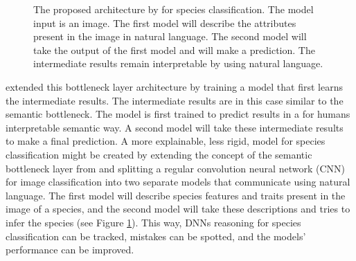 \documentclass[a4paper, 12pt, oneside]{book} %
\begin{document}
\begin{figure} [tbp]
    \centering
    \vspace{0cm}
    \caption[Proposed architecture]{The proposed architecture by \textcite{ishikawa_contextual_2021} for species classification. The model input is an image. The first model will describe the attributes present in the image in natural language. The second model will take the output of the first model and will make a prediction. The intermediate results remain interpretable by using natural language.}
    \label{fig:intro}
\end{figure}

\textcite{ishikawa_contextual_2021} extended this bottleneck layer architecture by training a model that first learns the intermediate results.
The intermediate results are in this case similar to the semantic bottleneck.
The model is first trained to predict results in a for humans interpretable semantic way.
A second model will take these intermediate results to make a final prediction.
A more explainable, less rigid, model for species classification might be created by extending the concept of the semantic bottleneck layer from \textcite{ishikawa_contextual_2021} and splitting a regular convolution neural network (CNN) for image classification into two separate models that communicate using natural language.
The first model will describe species features and traits present in the image of a species, and the second model will take these descriptions and tries to infer the species (see Figure \ref{fig:intro}).
This way, DNNs reasoning for species classification can be tracked, mistakes can be spotted, and the models' performance can be improved.
\end{document}
